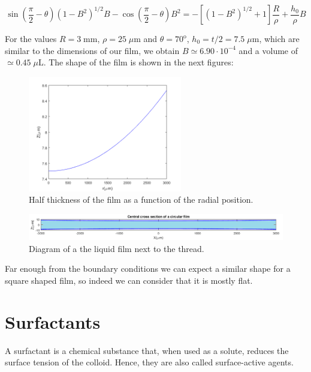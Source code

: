 \begin{equation}
\sin \left(\frac{\pi}{2} - \theta \right) (1 - B^2)^{1/2} B - \cos \left(\frac{\pi}{2} - \theta\right) B^2 = - [(1 - B^2)^{1/2}+1] \frac{R}{\rho} + \frac{h_0}{\rho} B
\end{equation}

For the values $R = 3 \; \textrm{mm}$, $\rho = 25 \; \mu \textrm{m}$ and $\theta = 70^\textrm{o}$, $h_0 = t/2 = 7.5 \; \mu \textrm{m}$, which are similar to the dimensions of our film, we obtain $B \simeq 6.90 \cdot 10^{-4}$ and a volume of $ \simeq 0.45 \; \mu \textrm{L}$. The shape of the film is shown in the next figures:

\begin{figure}[H]
	\centering
	\includegraphics[width=0.6\textwidth]{archivos/CircFilmFunction.png}
	\caption{Half thickness of the film as a function of the radial position.}
	\label{CircFilmFunction}
\end{figure}

\begin{figure}[H]
	\centering
	\includegraphics[width=\textwidth]{archivos/CircFilmSection.png}
	\caption{Diagram of a the liquid film next to the thread.}
	\label{CircFilmSection}
\end{figure}

Far enough from the boundary conditions we can expect a similar shape for a square shaped film, so indeed we can consider that it is mostly flat.

\section{Surfactants}

A surfactant is a chemical substance that, when used as a solute, reduces the surface tension of the colloid. Hence, they are also called surface-active agents.
 

